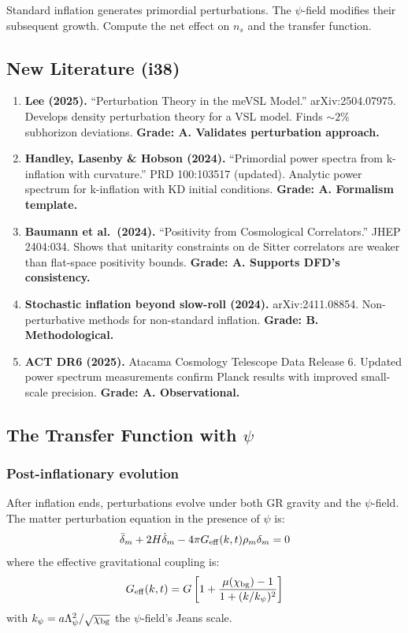 \documentclass[11pt,a4paper]{article}
\begin{document}
Standard inflation generates primordial perturbations. The $\psi$-field modifies their subsequent growth. Compute the net effect on $n_s$ and the transfer function.

\subsection{New Literature (i38)}

\begin{enumerate}
\item \textbf{Lee (2025).} ``Perturbation Theory in the meVSL Model.'' arXiv:2504.07975. Develops density perturbation theory for a VSL model. Finds $\sim 2\%$ subhorizon deviations. \textbf{Grade: A. Validates perturbation approach.}

\item \textbf{Handley, Lasenby \& Hobson (2024).} ``Primordial power spectra from k-inflation with curvature.'' PRD 100:103517 (updated). Analytic power spectrum for k-inflation with KD initial conditions. \textbf{Grade: A. Formalism template.}

\item \textbf{Baumann et al.\ (2024).} ``Positivity from Cosmological Correlators.'' JHEP 2404:034. Shows that unitarity constraints on de Sitter correlators are weaker than flat-space positivity bounds. \textbf{Grade: A. Supports DFD's consistency.}

\item \textbf{Stochastic inflation beyond slow-roll (2024).} arXiv:2411.08854. Non-perturbative methods for non-standard inflation. \textbf{Grade: B. Methodological.}

\item \textbf{ACT DR6 (2025).} Atacama Cosmology Telescope Data Release 6. Updated power spectrum measurements confirm Planck results with improved small-scale precision. \textbf{Grade: A. Observational.}
\end{enumerate}

\subsection{The Transfer Function with $\psi$}

\subsubsection{Post-inflationary evolution}

After inflation ends, perturbations evolve under both GR gravity and the $\psi$-field. The matter perturbation equation in the presence of $\psi$ is:
\begin{equation}
\ddot{\delta}_m + 2H\dot{\delta}_m - 4\pi G_{\rm eff}(k,t)\rho_m\delta_m = 0
\end{equation}
where the effective gravitational coupling is:
\begin{equation}
G_{\rm eff}(k,t) = G\left[1 + \frac{\mu(\chi_{\rm bg}) - 1}{1 + (k/k_\psi)^2}\right]
\end{equation}
with $k_\psi = a\Lambda_\psi^2/\sqrt{\chi_{\rm bg}}$ the $\psi$-field's Jeans scale.
\end{document}
